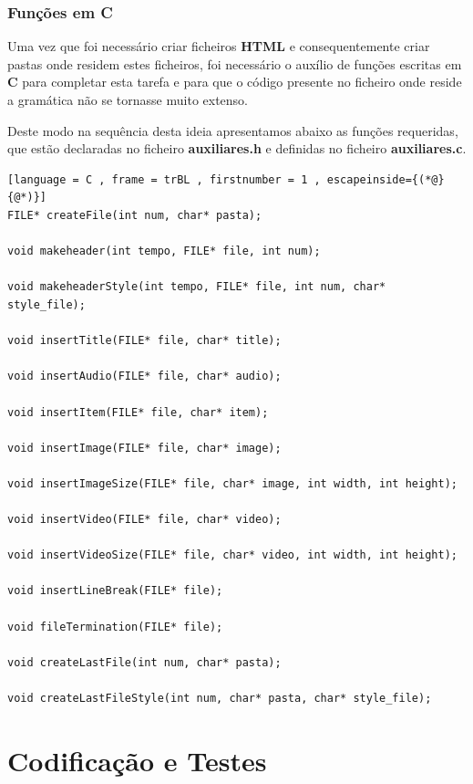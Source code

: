 \documentclass[11pt,a4paper]{report}
\begin{document}
\subsection{Funções em C}

Uma vez que foi necessário criar ficheiros \textbf{HTML} e consequentemente criar pastas onde residem estes ficheiros, foi necessário o auxílio de funções escritas em \textbf{C} para completar esta tarefa e para que o código presente no ficheiro onde reside a gramática não se tornasse muito extenso.

Deste modo na sequência desta ideia apresentamos abaixo as funções requeridas, que estão declaradas no ficheiro \textbf{auxiliares.h} e definidas no ficheiro \textbf{auxiliares.c}.

\vspace{0.5cm}

\begin{lstlisting}[language = C , frame = trBL , firstnumber = 1 , escapeinside={(*@}{@*)}]
FILE* createFile(int num, char* pasta);

void makeheader(int tempo, FILE* file, int num);

void makeheaderStyle(int tempo, FILE* file, int num, char* style_file);

void insertTitle(FILE* file, char* title);

void insertAudio(FILE* file, char* audio);

void insertItem(FILE* file, char* item);

void insertImage(FILE* file, char* image);

void insertImageSize(FILE* file, char* image, int width, int height);

void insertVideo(FILE* file, char* video);

void insertVideoSize(FILE* file, char* video, int width, int height);

void insertLineBreak(FILE* file);

void fileTermination(FILE* file);

void createLastFile(int num, char* pasta);

void createLastFileStyle(int num, char* pasta, char* style_file);

\end{lstlisting}

\chapter{Codificação e Testes}
\label{chap:codificacao}
\end{document}
